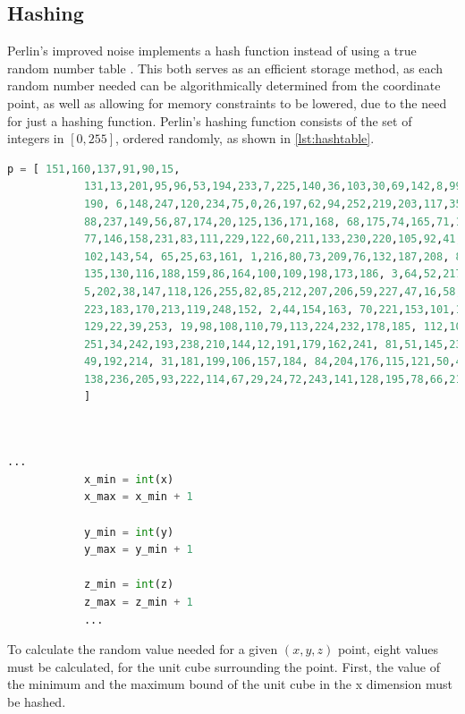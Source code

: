 \documentclass[10pt]{report}
\begin{document}
		\subsection{Hashing} \label{subsec:hashing}
		Perlin's improved noise implements a hash function instead of using a true random number table \cite{improv-noise}. This both serves as an efficient storage method, as each random number needed can be algorithmically determined from the coordinate point, as well as allowing for memory constraints to be lowered, due to the need for just a hashing function. Perlin's hashing function consists of the set of integers in \([0, 255]\), ordered randomly, as shown in \autoref{lst:hashtable}. 
		
		\begin{lstlisting}[label={lst:hashtable}, language=Python, frame=none, caption={Perlin's hashing table}, captionpos=b]
			p = [ 151,160,137,91,90,15,
			131,13,201,95,96,53,194,233,7,225,140,36,103,30,69,142,8,99,37,240,21,10,23,
			190, 6,148,247,120,234,75,0,26,197,62,94,252,219,203,117,35,11,32,57,177,33,
			88,237,149,56,87,174,20,125,136,171,168, 68,175,74,165,71,134,139,48,27,166,
			77,146,158,231,83,111,229,122,60,211,133,230,220,105,92,41,55,46,245,40,244,
			102,143,54, 65,25,63,161, 1,216,80,73,209,76,132,187,208, 89,18,169,200,196,
			135,130,116,188,159,86,164,100,109,198,173,186, 3,64,52,217,226,250,124,123,
			5,202,38,147,118,126,255,82,85,212,207,206,59,227,47,16,58,17,182,189,28,42,
			223,183,170,213,119,248,152, 2,44,154,163, 70,221,153,101,155,167, 43,172,9,
			129,22,39,253, 19,98,108,110,79,113,224,232,178,185, 112,104,218,246,97,228,
			251,34,242,193,238,210,144,12,191,179,162,241, 81,51,145,235,249,14,239,107,
			49,192,214, 31,181,199,106,157,184, 84,204,176,115,121,50,45,127, 4,150,254,
			138,236,205,93,222,114,67,29,24,72,243,141,128,195,78,66,215,61,156,180
			]
			
			
		\end{lstlisting}
	
		\begin{lstlisting}[language=Python, frame=none, caption={Unit cube's corner minimum values}, captionpos=b]
			...
			x_min = int(x)
			x_max = x_min + 1
			
			y_min = int(y)
			y_max = y_min + 1
			
			z_min = int(z)
			z_max = z_min + 1
			...
		\end{lstlisting}
		
		To calculate the random value needed for a given \((x,y,z)\) point, eight values must be calculated, for the unit cube surrounding the point. First, the value of the minimum and the maximum bound of the unit cube in the x dimension must be hashed. 
		
\end{document}
